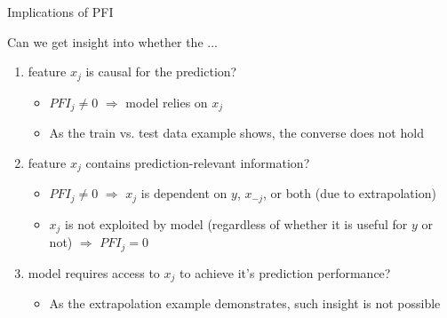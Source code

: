 \documentclass[10pt,compress,t,notes=noshow, xcolor=table]{beamer}
\begin{document}
\begin{frame}{Implications of PFI}

Can we get insight into whether the ...

\begin{enumerate}
    \item<1-> feature $x_j$ is causal for the prediction?
    \begin{itemize}
      \item $PFI_j \neq 0$ $\Rightarrow$ model relies on $x_j$
      \item As the train vs. test data example shows, the converse does not hold
    \end{itemize}
    \item<2-> feature $x_j$ contains prediction-relevant information?
    \begin{itemize}
      \item $PFI_j \neq 0$ $\Rightarrow$ $x_{j}$ is dependent on $y$, $x_{-j}$, or both (due to extrapolation) 
      \item $x_{j}$ is not exploited by model (regardless of whether it is useful for $y$ or not) $\Rightarrow$ $PFI_j = 0$  %
    \end{itemize}
    \item<3-> model requires access to $x_j$ to achieve it's prediction performance?    
    \begin{itemize}
      \item As the extrapolation example demonstrates, such insight is not possible
\end{itemize}
\end{enumerate}
\end{frame}


\end{document}
